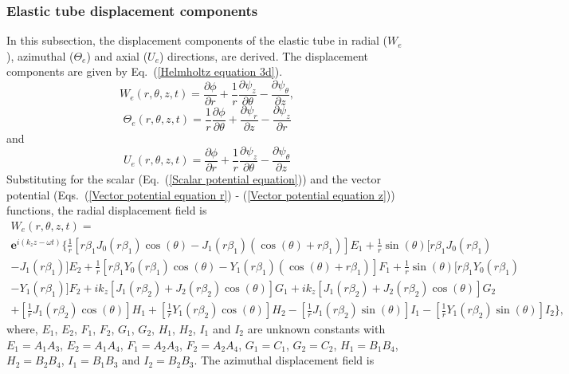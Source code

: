 \documentclass[11pt,cleanfoot]{asme2ej}
\begin{document}
\subsubsection{Elastic tube displacement components}
In this subsection, the displacement components of the elastic tube in radial ($W_e$), azimuthal ($\Theta_e$) and axial ($U_e$) directions, are derived. The displacement components are given by Eq.~(\ref{Helmholtz equation 3d}).
\begin{equation}
    W_{e}(r,\theta,z,t) = \frac{\partial\phi}{\partial r} + \frac{1}{r}\frac{\partial\psi_{z}}{\partial\theta} - \frac{\partial\psi_{\theta}}{\partial z},
\end{equation}
\begin{equation}
    \Theta_e(r,\theta,z,t) = \frac{1}{r}\frac{\partial\phi}{\partial\theta} + \frac{\partial\psi_r}{\partial z} - \frac{\partial\psi_z}{\partial r}
\end{equation}
and
\begin{equation}
    U_{e}(r,\theta,z,t) = \frac{\partial\phi}{\partial r} + \frac{1}{r}\frac{\partial\psi_{z}}{\partial\theta} - \frac{\partial\psi_{\theta}}{\partial z}
\end{equation}
Substituting for the scalar (Eq.~(\ref{Scalar potential equation})) and the vector potential (Eqs.~(\ref{Vector potential equation r}) - (\ref{Vector potential equation z})) functions, the radial displacement field is
\begin{multline}
    W_e(r,\theta,z,t) =\\ \mathbf{e}^{i(k_{z}z-\omega t)}\bigg\{\frac{1}{r}[r\beta_1 J_0(r\beta_1)\cos(\theta) - J_1(r\beta_1)(\cos(\theta) + r\beta_1)]E_1 + \frac{1}{r}\sin(\theta)[r\beta_1 J_0(r\beta_1)\\ - J_1(r\beta_1)]E_2 + \frac{1}{r}[r\beta_1 Y_0(r\beta_1)\cos(\theta) - Y_1(r\beta_1)(\cos(\theta) + r\beta_1)]F_1 + \frac{1}{r}\sin(\theta)[r\beta_1 Y_0(r\beta_1)\\ - Y_1(r\beta_1)]F_2 + ik_z[J_1(r\beta_2) + J_2(r\beta_2)\cos(\theta)]G_1 + ik_z[J_1(r\beta_2) + J_2(r\beta_2)\cos(\theta)]G_2\\ + [\frac{1}{r}J_1(r\beta_2)\cos(\theta)]H_1 + [\frac{1}{r}Y_1(r\beta_2)\cos(\theta)]H_2 - [\frac{1}{r}J_1(r\beta_2)\sin(\theta)]I_1 - [\frac{1}{r}Y_1(r\beta_2)\sin(\theta)]I_2 \bigg\},
\end{multline}
where, $E_1$, $E_2$, $F_1$, $F_2$, $G_1$, $G_2$, $H_1$, $H_2$, $I_1$ and $I_2$ are unknown constants with $E_1 = A_1A_3$, $E_2 = A_1A_4$, $F_1 = A_2A_3$, $F_2 = A_2A_4$, $G_1 = C_1$, $G_2 = C_2$, $H_1 = B_1B_4$, $H_2 = B_2B_4$, $I_1 = B_1B_3$ and $I_2 = B_2B_3$. The azimuthal displacement field is
\end{document}
